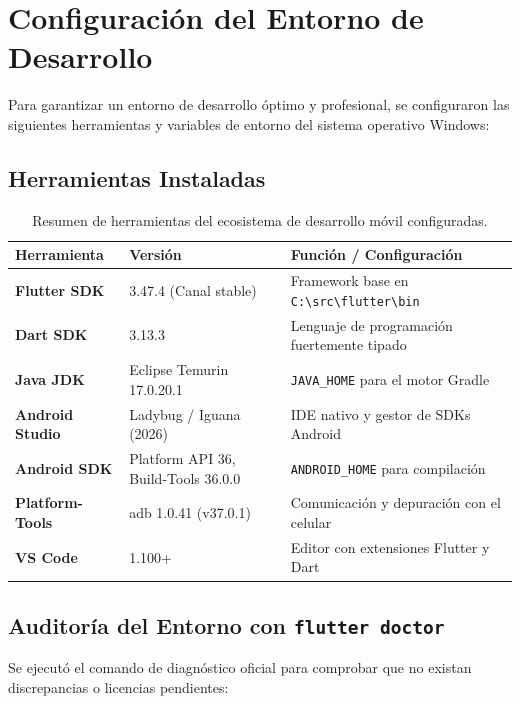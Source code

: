 \documentclass[12pt,a4paper]{article}
\begin{document}
\section{Configuración del Entorno de Desarrollo}

Para garantizar un entorno de desarrollo óptimo y profesional, se configuraron las siguientes herramientas y variables de entorno del sistema operativo Windows:

\subsection{Herramientas Instaladas}
\begin{table}[h!]
\centering
\small
\begin{tabularx}{\textwidth}{lXp{5.5cm}}
\toprule
\textbf{Herramienta} & \textbf{Versión} & \textbf{Función / Configuración} \\
\midrule
\textbf{Flutter SDK} & 3.47.4 (Canal stable) & Framework base en \texttt{C:\textbackslash src\textbackslash flutter\textbackslash bin} \\
\textbf{Dart SDK} & 3.13.3 & Lenguaje de programación fuertemente tipado \\
\textbf{Java JDK} & Eclipse Temurin 17.0.20.1 & \texttt{JAVA\_HOME} para el motor Gradle \\
\textbf{Android Studio} & Ladybug / Iguana (2026) & IDE nativo y gestor de SDKs Android \\
\textbf{Android SDK} & Platform API 36, Build-Tools 36.0.0 & \texttt{ANDROID\_HOME} para compilación \\
\textbf{Platform-Tools} & adb 1.0.41 (v37.0.1) & Comunicación y depuración con el celular \\
\textbf{VS Code} & 1.100+ & Editor con extensiones Flutter y Dart \\
\bottomrule
\end{tabularx}
\caption{Resumen de herramientas del ecosistema de desarrollo móvil configuradas.}
\label{tab:herramientas}
\end{table}

\subsection{Auditoría del Entorno con \texttt{flutter doctor}}
Se ejecutó el comando de diagnóstico oficial para comprobar que no existan discrepancias o licencias pendientes:
\end{document}

